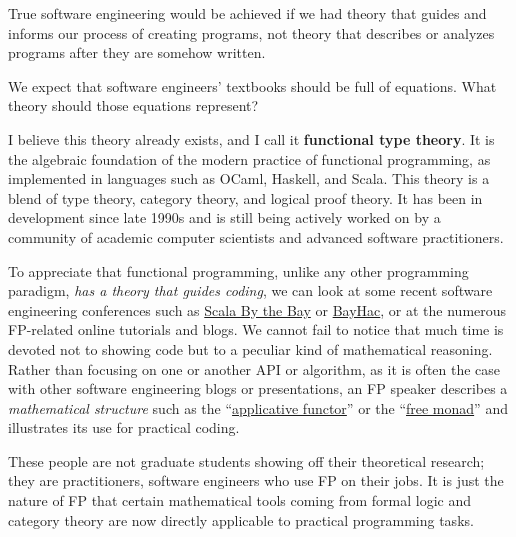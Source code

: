 True software engineering would be achieved if we had theory that
guides and informs our process of creating programs, \textendash{}
not theory that describes or analyzes programs after they are somehow
written.

We expect that software engineers' textbooks should be full of equations.
What theory should those equations represent?

I believe this theory already exists, and I call it \textbf{functional
type theory}. It is the algebraic foundation
of the modern practice of functional programming, as implemented in
languages such as OCaml, Haskell, and Scala. This theory is a blend
of type theory, category theory, and logical proof theory. It has
been in development since late 1990s and is still being actively worked
on by a community of academic computer scientists and advanced software
practitioners.

To appreciate that functional programming, unlike any other programming
paradigm, \emph{has a theory that guides coding}, we can look at some
recent software engineering conferences such as \href{http://2015.scala.bythebay.io/}{Scala By the Bay}
or \href{http://bayhac.org/}{BayHac}, or at the numerous FP-related
online tutorials and blogs. We cannot fail to notice that much time
is devoted not to showing code but to a peculiar kind of mathematical
reasoning. Rather than focusing on one or another API or algorithm,
as it is often the case with other software engineering blogs or presentations,
an FP speaker describes a \emph{mathematical structure} \textendash{}
such as the ``\href{http://www.youtube.com/watch?v=bmIxIslimVY}{applicative functor}''
or the ``\href{http://www.youtube.com/watch?v=U0lK0hnbc4U}{free monad}''
\textendash{} and illustrates its use for practical coding.

These people are not graduate students showing off their theoretical
research; they are practitioners, software engineers who use FP on
their jobs. It is just the nature of FP that certain mathematical
tools \textendash{} coming from formal logic and category theory \textendash{}
are now directly applicable to practical programming tasks.

